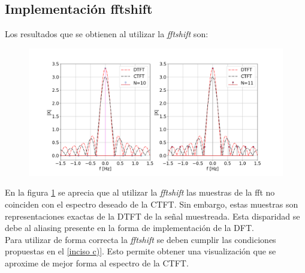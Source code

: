 \documentclass[letterpaper]{article}
\begin{document}
    
\subsection{Implementación fftshift}
Los resultados que se obtienen al utilizar la \textit{fftshift} son:
\begin{figure}[]
    \centering
    \includegraphics[width=\textwidth]{Img/punto_4_f.png}
    \caption{}
    \label{fftshift}
\end{figure}
En la figura \ref{fftshift} se aprecia que al utilizar la \textit{fftshift} las muestras de la fft no coinciden con el espectro deseado de la CTFT. Sin embargo,
estas muestras son representaciones exactas de la DTFT de la señal muestreada. Esta disparidad se debe al aliasing presente en la forma de implementación de la DFT.\\
Para utilizar de forma correcta la \textit{fftshift} se deben cumplir las condiciones propuestas en el \ref{inciso c)}. Esto permite obtener una visualización que se aproxime de mejor 
forma al espectro de la CTFT. 
\end{document}
